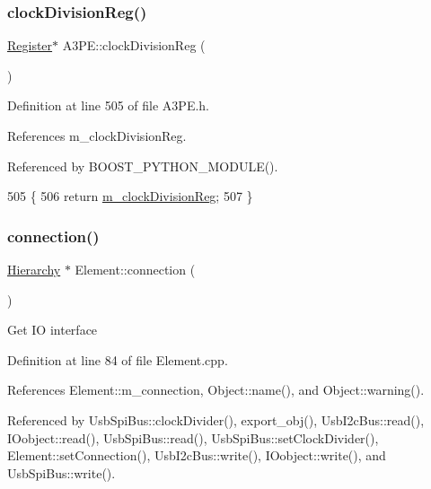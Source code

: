 \subsubsection{\texorpdfstring{clock\+Division\+Reg()}{clockDivisionReg()}}
{\footnotesize\ttfamily \hyperlink{classRegister}{Register}$\ast$ A3\+P\+E\+::clock\+Division\+Reg (\begin{DoxyParamCaption}{ }\end{DoxyParamCaption})\hspace{0.3cm}{\ttfamily [inline]}}



Definition at line 505 of file A3\+P\+E.\+h.



References m\+\_\+clock\+Division\+Reg.



Referenced by B\+O\+O\+S\+T\+\_\+\+P\+Y\+T\+H\+O\+N\+\_\+\+M\+O\+D\+U\+L\+E().


\begin{DoxyCode}
505                               \{
506     \textcolor{keywordflow}{return} \hyperlink{classA3PE_ae1f4c24a99c2e6ae944a080f429cc155}{m\_clockDivisionReg};
507   \}
\end{DoxyCode}
\mbox{\label{classElement_af57444353c1ddf9fa0109801e97debf7}} 
\subsubsection{\texorpdfstring{connection()}{connection()}}
{\footnotesize\ttfamily \hyperlink{classHierarchy}{Hierarchy} $\ast$ Element\+::connection (\begin{DoxyParamCaption}{ }\end{DoxyParamCaption})\hspace{0.3cm}{\ttfamily [inherited]}}

Get IO interface 

Definition at line 84 of file Element.\+cpp.



References Element\+::m\+\_\+connection, Object\+::name(), and Object\+::warning().



Referenced by Usb\+Spi\+Bus\+::clock\+Divider(), export\+\_\+obj(), Usb\+I2c\+Bus\+::read(), I\+Oobject\+::read(), Usb\+Spi\+Bus\+::read(), Usb\+Spi\+Bus\+::set\+Clock\+Divider(), Element\+::set\+Connection(), Usb\+I2c\+Bus\+::write(), I\+Oobject\+::write(), and Usb\+Spi\+Bus\+::write().


